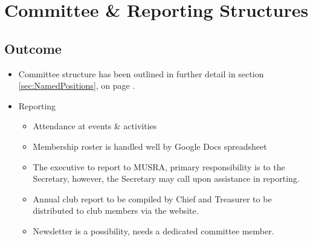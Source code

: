\section{Committee \& Reporting Structures}
\label{sec:CommitteeAndReporting}
\subsection{Outcome}
\begin{itemize}
  \item Committee structure has been outlined in further detail in section
  \ref{sec:NamedPositions},  on page
  \pageref{sec:NamedPositions}.
  \item Reporting
  \begin{itemize}
    \item Attendance at events \& activities
    \item Membership roster is handled well by Google Docs spreadsheet
    \item The executive to report to MUSRA, primary responsibility is to the
    Secretary, however, the Secretary may call upon assistance in reporting.
    \item Annual club report to be compiled by Chief and Treasurer to be
    distributed to club members via the website.
    \item Newsletter is a possibility, needs a dedicated committee member.
  \end{itemize}
\end{itemize}